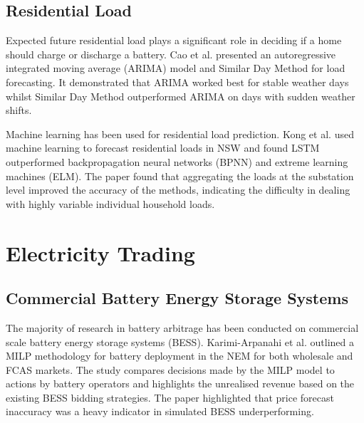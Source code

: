 \subsection{Residential Load}
Expected future residential load plays a significant role in deciding if a home should charge or discharge a battery. Cao et al. \cite{cao2015hybrid} presented an autoregressive integrated moving average (ARIMA) model and Similar Day Method for load forecasting. It demonstrated that ARIMA worked best for stable weather days whilst Similar Day Method outperformed ARIMA on days with sudden weather shifts. \par
Machine learning has been used for residential load prediction. Kong et al. \cite{kong2019lstm} used machine learning to forecast residential loads in NSW and found LSTM outperformed backpropagation neural networks (BPNN) and extreme learning machines (ELM). The paper found that aggregating the loads at the substation level improved the accuracy of the methods, indicating the difficulty in dealing with highly variable individual household loads.

\section{Electricity Trading}
\label{sec:bg2}

\subsection{Commercial Battery Energy Storage Systems}
\label{sec:bg2.1}
The majority of research in battery arbitrage has been conducted on commercial scale battery energy storage systems (BESS). Karimi-Arpanahi et al.\cite{KarimiArpanahi2024} outlined a MILP methodology for battery deployment in the NEM for both wholesale and FCAS markets. The study compares decisions made by the MILP model to actions by battery operators and highlights the unrealised revenue based on the existing BESS bidding strategies. The paper highlighted that price forecast inaccuracy was a heavy indicator in simulated BESS underperforming. \par

